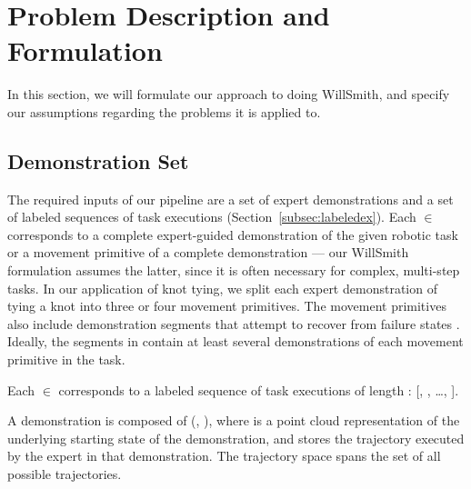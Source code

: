 \section{Problem Description and Formulation}
\label{sec:formulation}
%

In this section, we will formulate our approach to doing WillSmith, and
specify our assumptions regarding the problems it is applied to.

\subsection{Demonstration Set}

The required inputs of our pipeline are a set \demoset{}
of expert demonstrations and a set  of labeled sequences of
task executions (Section~\ref{subsec:labeledex}).
Each \demovar{} $\in$ \demoset{} corresponds to a complete expert-guided
demonstration of the given robotic task or a movement primitive of a complete
demonstration --- our WillSmith formulation assumes the latter,
since it is often necessary for complex, multi-step tasks.
In our application of knot tying, we split each expert demonstration of
tying a knot into three or four movement primitives. The movement primitives
also include demonstration segments that attempt to
recover from failure states \cite{Schulmanetal_ISRR2013}.
Ideally, the segments in \demoset{} contain at least several demonstrations
of each movement primitive in the task.


Each  $\in$  corresponds to a labeled sequence of
task executions of length : [, , \ldots,
]. 

A demonstration \demovar{} is composed of (, ),
where  is a point cloud representation of the underlying
starting state of the demonstration, and  stores
the trajectory executed by the expert in that demonstration. The trajectory
space \trajset{} spans the set of all possible trajectories.


